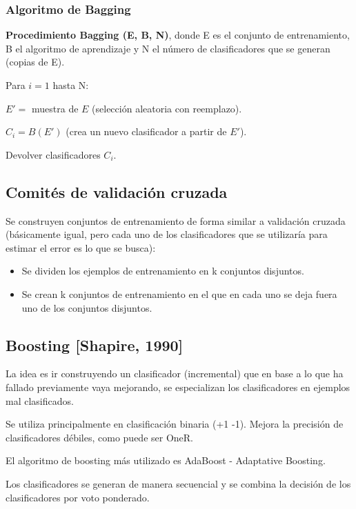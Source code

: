 \documentclass[12pt]{report} %
\begin{document}
\subsubsection{Algoritmo de Bagging}
\textbf{Procedimiento Bagging (E, B, N)}, donde E es el conjunto de entrenamiento, B el algoritmo de aprendizaje y N el número de clasificadores que se generan (copias de E).

Para $i = 1$ hasta N:

\hspace{6mm} $E' =$ muestra de $E$ (selección aleatoria con reemplazo).

\hspace{6mm} $C_i = B(E')$ (crea un nuevo clasificador a partir de $E'$).

Devolver clasificadores $C_i$.

\subsection{Comités de validación cruzada}
Se construyen conjuntos de entrenamiento de forma similar a validación cruzada (básicamente igual, pero cada uno de los clasificadores que se utilizaría para estimar el error es lo que se busca):
\begin{itemize}
  \item Se dividen los ejemplos de entrenamiento en k conjuntos disjuntos.
  \item Se crean k conjuntos de entrenamiento en el que en cada uno se deja fuera uno de los conjuntos disjuntos.
\end{itemize}

\subsection{Boosting [Shapire, 1990]}
La idea es ir construyendo un clasificador (incremental) que en base a lo que ha fallado previamente vaya mejorando, se especializan los clasificadores en ejemplos mal clasificados.

Se utiliza principalmente en clasificación binaria (+1 -1). Mejora la precisión de clasificadores débiles, como puede ser OneR.

El algoritmo de boosting más utilizado es AdaBoost - Adaptative Boosting.

Los clasificadores se generan de manera secuencial y se combina la decisión de los clasificadores por voto ponderado.
\end{document}
